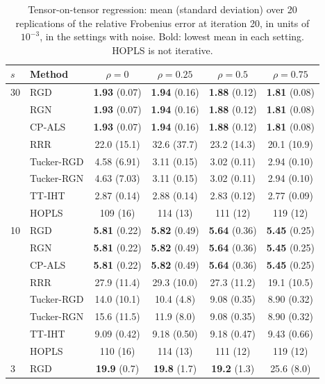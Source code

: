 \begin{table}[!htbp]
\centering
\caption{Tensor-on-tensor regression: mean (standard deviation) over 20 replications of the relative Frobenius error at iteration 20, in units of $10^{-3}$, in the settings with noise. Bold: lowest mean in each setting. HOPLS is not iterative.}
\label{tab:regression_errors}
{\small
\begin{tabular}{llcccc}
\toprule
$s$ & Method & $\rho=0$ & $\rho=0.25$ & $\rho=0.5$ & $\rho=0.75$ \\
\midrule
30 & RGD & \textbf{1.93} (0.07) & \textbf{1.94} (0.16) & \textbf{1.88} (0.12) & \textbf{1.81} (0.08) \\
 & RGN & \textbf{1.93} (0.07) & \textbf{1.94} (0.16) & \textbf{1.88} (0.12) & \textbf{1.81} (0.08) \\
 & CP-ALS & \textbf{1.93} (0.07) & \textbf{1.94} (0.16) & \textbf{1.88} (0.12) & \textbf{1.81} (0.08) \\
 & RRR & 22.0 (15.1) & 32.6 (37.7) & 23.2 (14.3) & 20.1 (10.9) \\
 & Tucker-RGD & 4.58 (6.91) & 3.11 (0.15) & 3.02 (0.11) & 2.94 (0.10) \\
 & Tucker-RGN & 4.63 (7.03) & 3.11 (0.15) & 3.02 (0.11) & 2.94 (0.10) \\
 & TT-IHT & 2.87 (0.14) & 2.88 (0.14) & 2.83 (0.12) & 2.77 (0.09) \\
 & HOPLS & 109 (16) & 114 (13) & 111 (12) & 119 (12) \\
\midrule
10 & RGD & \textbf{5.81} (0.22) & \textbf{5.82} (0.49) & \textbf{5.64} (0.36) & \textbf{5.45} (0.25) \\
 & RGN & \textbf{5.81} (0.22) & \textbf{5.82} (0.49) & \textbf{5.64} (0.36) & \textbf{5.45} (0.25) \\
 & CP-ALS & \textbf{5.81} (0.22) & \textbf{5.82} (0.49) & \textbf{5.64} (0.36) & \textbf{5.45} (0.25) \\
 & RRR & 27.9 (11.4) & 29.3 (10.0) & 27.3 (11.2) & 19.1 (10.5) \\
 & Tucker-RGD & 14.0 (10.1) & 10.4 (4.8) & 9.08 (0.35) & 8.90 (0.32) \\
 & Tucker-RGN & 15.6 (11.5) & 11.9 (8.0) & 9.08 (0.35) & 8.90 (0.32) \\
 & TT-IHT & 9.09 (0.42) & 9.18 (0.50) & 9.18 (0.47) & 9.43 (0.66) \\
 & HOPLS & 110 (16) & 114 (13) & 111 (12) & 119 (12) \\
\midrule
3 & RGD & \textbf{19.9} (0.7) & \textbf{19.8} (1.7) & \textbf{19.2} (1.3) & 25.6 (8.0) \\

\end{tabular}}
\end{table}
